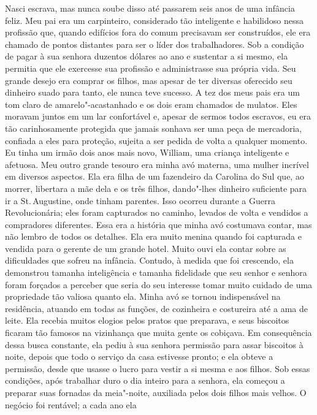 Nasci escrava, mas nunca soube disso
até passarem seis anos de uma infância feliz. Meu pai era um
carpinteiro, considerado tão inteligente e habilidoso nessa profissão
que, quando edifícios fora do comum precisavam ser construídos, ele era
chamado de pontos distantes para ser o líder dos trabalhadores. Sob a
condição de pagar à sua senhora duzentos dólares ao ano e sustentar a si
mesmo, ela permitia que ele exercesse sua profissão e administrasse sua
própria vida. Seu grande desejo era comprar os filhos, mas apesar de ter
diversas oferecido seu dinheiro suado para tanto, ele nunca teve
sucesso. A tez dos meus pais era um tom claro de amarelo"-acastanhado e
os dois eram chamados de mulatos. Eles moravam juntos em um lar
confortável e, apesar de sermos todos escravos, eu era tão
carinhosamente protegida que jamais sonhava ser uma peça de mercadoria,
confiada a eles para proteção, sujeita a ser pedida de volta a qualquer
momento. Eu tinha um irmão dois anos mais novo, William, uma criança
inteligente e afetuosa. Meu outro grande tesouro era minha avó materna,
uma mulher incrível em diversos aspectos. Ela era filha de um fazendeiro
da Carolina do Sul que, ao morrer, libertara a mãe dela e os três
filhos, dando"-lhes dinheiro suficiente para ir a St.\,Augustine, onde
tinham parentes. Isso ocorreu durante a Guerra Revolucionária; eles
foram capturados no caminho, levados de volta e vendidos a compradores
diferentes. Essa era a história que minha avó costumava contar, mas não
lembro de todos os detalhes. Ela era muito menina quando foi capturada e
vendida para o gerente de um grande hotel. Muito ouvi ela contar sobre
as dificuldades que sofreu na infância. Contudo, à medida que foi
crescendo, ela demonstrou tamanha inteligência e tamanha fidelidade que
seu senhor e senhora foram forçados a perceber que seria do seu
interesse tomar muito cuidado de uma propriedade tão valiosa quanto ela.
Minha avó se tornou indispensável na residência, atuando em todas as
funções, de cozinheira e costureira até a ama de leite. Ela recebia
muitos elogios pelos pratos que preparava, e seus biscoitos ficaram tão
famosos na vizinhança que muita gente os cobiçava. Em consequência dessa
busca constante, ela pediu à sua senhora permissão para assar biscoitos
à noite, depois que todo o serviço da casa estivesse pronto; e ela
obteve a permissão, desde que usasse o lucro para vestir a si mesma e
aos filhos. Sob essas condições, após trabalhar duro o dia inteiro para
a senhora, ela começou a preparar suas fornadas da meia"-noite, auxiliada
pelos dois filhos mais velhos. O negócio foi rentável; a cada ano ela
